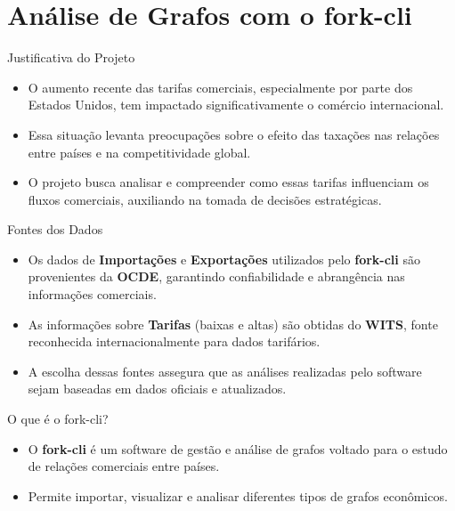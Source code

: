 \section{Análise de Grafos com o fork-cli}

\begin{frame}[plain]
  \centering
  \Huge \insertsection
\end{frame}

\begin{frame}{Justificativa do Projeto}
  \begin{itemize}
    \item O aumento recente das tarifas comerciais, especialmente por parte dos Estados Unidos, tem impactado significativamente o comércio internacional.
    \item Essa situação levanta preocupações sobre o efeito das taxações nas relações entre países e na competitividade global.
    \item O projeto busca analisar e compreender como essas tarifas influenciam os fluxos comerciais, auxiliando na tomada de decisões estratégicas.
  \end{itemize}
\end{frame}

\begin{frame}{Fontes dos Dados}
  \begin{itemize}
    \item Os dados de \textbf{Importações} e \textbf{Exportações} utilizados pelo \textbf{fork-cli} são provenientes da \textbf{OCDE}, garantindo confiabilidade e abrangência nas informações comerciais.
    \item As informações sobre \textbf{Tarifas} (baixas e altas) são obtidas do \textbf{WITS}, fonte reconhecida internacionalmente para dados tarifários.
    \item A escolha dessas fontes assegura que as análises realizadas pelo software sejam baseadas em dados oficiais e atualizados.
  \end{itemize}
\end{frame}

\begin{frame}{O que é o fork-cli?}
  \begin{itemize}
    \item O \textbf{fork-cli} é um software de gestão e análise de grafos voltado para o estudo de relações comerciais entre países.
    \item Permite importar, visualizar e analisar diferentes tipos de grafos econômicos.
  \end{itemize}
\end{frame}

